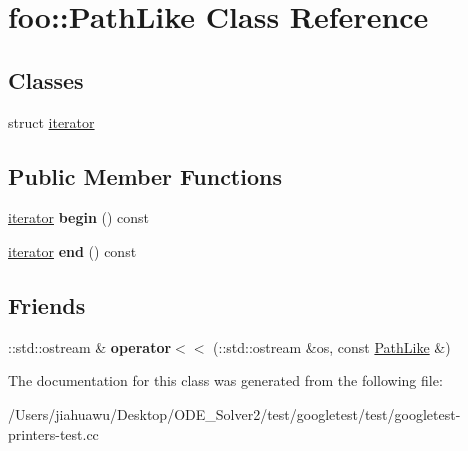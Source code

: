 \hypertarget{classfoo_1_1_path_like}{}\section{foo\+:\+:Path\+Like Class Reference}
\label{classfoo_1_1_path_like}
\subsection*{Classes}
\begin{DoxyCompactItemize}
\item 
struct \mbox{\hyperlink{structfoo_1_1_path_like_1_1iterator}{iterator}}
\end{DoxyCompactItemize}
\subsection*{Public Member Functions}
\begin{DoxyCompactItemize}
\item 
\mbox{\label{classfoo_1_1_path_like_a7ca8b63139fd6fcada55fbf13ccf9c83}} 
\mbox{\hyperlink{structfoo_1_1_path_like_1_1iterator}{iterator}} {\bfseries begin} () const
\item 
\mbox{\label{classfoo_1_1_path_like_aca85cd005890f1d19f416ca7e2c95f02}} 
\mbox{\hyperlink{structfoo_1_1_path_like_1_1iterator}{iterator}} {\bfseries end} () const
\end{DoxyCompactItemize}
\subsection*{Friends}
\begin{DoxyCompactItemize}
\item 
\mbox{\label{classfoo_1_1_path_like_ab5544a5497a8a470802bd8fcf97c49da}} 
\+::std\+::ostream \& {\bfseries operator$<$$<$} (\+::std\+::ostream \&os, const \mbox{\hyperlink{classfoo_1_1_path_like}{Path\+Like}} \&)
\end{DoxyCompactItemize}


The documentation for this class was generated from the following file\+:\begin{DoxyCompactItemize}
\item 
/\+Users/jiahuawu/\+Desktop/\+O\+D\+E\+\_\+\+Solver2/test/googletest/test/googletest-\/printers-\/test.\+cc\end{DoxyCompactItemize}

